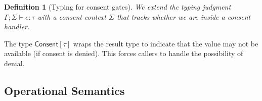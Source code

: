 \documentclass[11pt,a4paper]{article}
\newtheorem{definition}[theorem]{Definition}
\begin{document}
\begin{definition}[Typing for consent gates]
\label{def:consent-typing}
We extend the typing judgment $\Gamma; \Sigma \vdash e : \tau$ with a
consent context $\Sigma$ that tracks whether we are inside a consent
handler.

\end{definition}

The type $\mathsf{Consent}[\tau]$ wraps the result type to indicate
that the value may not be available (if consent is denied).  This
forces callers to handle the possibility of denial.

\subsection{Operational Semantics}
\end{document}
